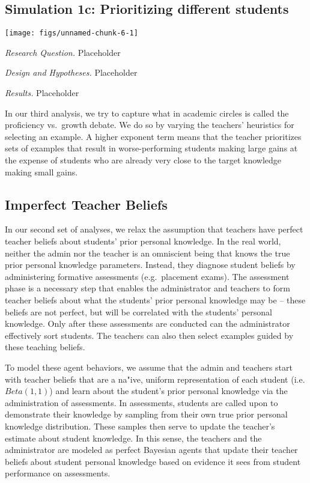 \documentclass[10pt, letterpaper]{article}
\newenvironment{CodeChunk}{}{}
\begin{document}
\subsection{Simulation 1c: Prioritizing different
students}\label{simulation-1c-prioritizing-different-students}

\begin{CodeChunk}

\texttt{[image: figs/unnamed-chunk-6-1]} \end{CodeChunk}

\emph{Research Question. } Placeholder

\emph{Design and Hypotheses. } Placeholder

\emph{Results. } Placeholder

In our third analysis, we try to capture what in academic circles is
called the proficiency vs.~growth debate. We do so by varying the
teachers' heuristics for selecting an example. A higher exponent term
means that the teacher prioritizes sets of examples that result in
worse-performing students making large gains at the expense of students
who are already very close to the target knowledge making small gains.

\subsection{Imperfect Teacher Beliefs}\label{imperfect-teacher-beliefs}

In our second set of analyses, we relax the assumption that teachers
have perfect teacher beliefs about students' prior personal knowledge.
In the real world, neither the admin nor the teacher is an omniscient
being that knows the true prior personal knowledge parameters. Instead,
they diagnose student beliefs by administering formative assessments
(e.g.~placement exams). The assessment phase is a necessary step that
enables the administrator and teachers to form teacher beliefs about
what the students' prior personal knowledge may be -- these beliefs are
not perfect, but will be correlated with the students' personal
knowledge. Only after these assessments are conducted can the
administrator effectively sort students. The teachers can also then
select examples guided by these teaching beliefs.

To model these agent behaviors, we assume that the admin and teachers
start with teacher beliefs that are a na"ive, uniform representation of
each student (i.e. \(Beta(1,1)\)) and learn about the student's prior
personal knowledge via the administration of assessments. In
assessments, students are called upon to demonstrate their knowledge by
sampling from their own true prior personal knowledge distribution.
These samples then serve to update the teacher's estimate about student
knowledge. In this sense, the teachers and the administrator are modeled
as perfect Bayesian agents that update their teacher beliefs about
student personal knowledge based on evidence it sees from student
performance on assessments.
\end{document}
